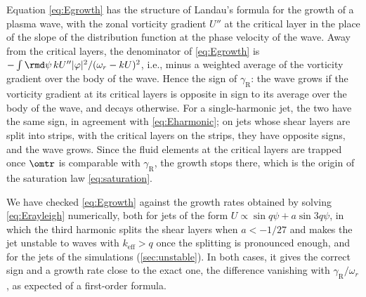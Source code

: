 Equation \cref{eq:Egrowth} has the structure of Landau's formula for the growth of a plasma wave, with the zonal vorticity gradient \(U''\) at the critical layer in the place of the slope of the distribution function at the phase velocity of the wave. Away from the critical layers, the denominator of \cref{eq:Egrowth} is \(-\int\rmd\psi\,kU''|\varphi|^2/(\omega_r - kU)^2\), i.e., minus a weighted average of the vorticity gradient over the body of the wave. Hence the sign of \(\gamma_\text{R}\): the wave grows if the vorticity gradient at its critical layers is opposite in sign to its average over the body of the wave, and decays otherwise. For a single-harmonic jet, the two have the same sign, in agreement with \cref{eq:Eharmonic}; on jets whose shear layers are split into strips, with the critical layers on the strips, they have opposite signs, and the wave grows. Since the fluid elements at the critical layers are trapped once \(\omtr\) is comparable with \(\gamma_\text{R}\), the growth stops there, which is the origin of the saturation law \cref{eq:saturation}.

We have checked \cref{eq:Egrowth} against the growth rates obtained by solving \cref{eq:Erayleigh} numerically, both for jets of the form \(U\propto\sin q\psi + a\sin3q\psi\), in which the third harmonic splits the shear layers when \(a < -1/27\) and makes the jet unstable to waves with \(k_\text{eff} > q\) once the splitting is pronounced enough, and for the jets of the simulations (\cref{sec:unstable}). In both cases, it gives the correct sign and a growth rate close to the exact one, the difference vanishing with \(\gamma_\text{R}/\omega_r\), as expected of a first-order formula.
